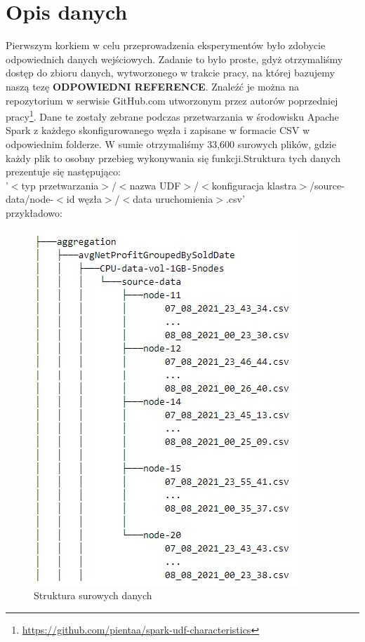 \chapter{Opis danych}

Pierwszym korkiem w celu przeprowadzenia eksperymentów było zdobycie odpowiednich danych wejściowych. Zadanie to było proste, gdyż otrzymaliśmy dostęp do zbioru danych, wytworzonego w trakcie pracy, na której bazujemy naszą tezę \textbf{ODPOWIEDNI REFERENCE}. Znaleźć je można na repozytorium w serwisie GitHub.com utworzonym przez autorów poprzedniej pracy\footnote{\url{https://github.com/pientaa/spark-udf-characteristics}}.
Dane te zostały zebrane podczas przetwarzania w środowisku Apache Spark z każdego skonfigurowanego węzła i zapisane w formacie CSV w odpowiednim folderze. W sumie otrzymaliśmy 33,600 surowych plików, gdzie każdy plik to osobny przebieg wykonywania się funkcji.Struktura tych danych prezentuje się następująco:\\ 
\noindent'$<$typ przetwarzania$>$/$<$nazwa UDF$>$/$<$konfiguracja klastra$>$/source-data/node-$<$id węzła$>$/$<$data uruchomienia$>$.csv'\\
przykładowo:
\begin{figure}[H]
    \centering
    \captionsetup{justification=centering,margin=0.5cm}
    \includegraphics[scale=0.8]{figures/04-opis-danych/folder_structure.JPG}
    \caption{Struktura surowych danych}
    \label{fig:raw_file_structure}
\end{figure}
